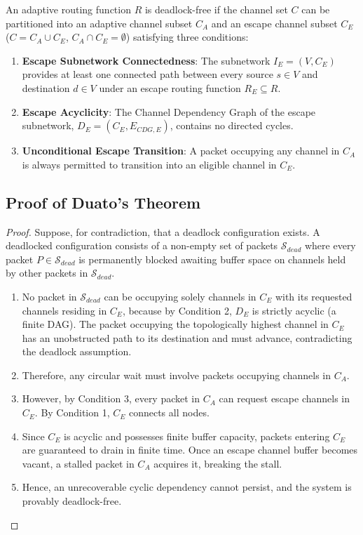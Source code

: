 \begin{theorem}[Duato, 1993]
An adaptive routing function $R$ is deadlock-free if the channel set $C$ can be partitioned into an adaptive channel subset $C_A$ and an escape channel subset $C_E$ ($C = C_A \cup C_E$, $C_A \cap C_E = \emptyset$) satisfying three conditions:
\begin{enumerate}
    \item \textbf{Escape Subnetwork Connectedness}: The subnetwork $I_E = (V, C_E)$ provides at least one connected path between every source $s \in V$ and destination $d \in V$ under an escape routing function $R_E \subseteq R$.
    \item \textbf{Escape Acyclicity}: The Channel Dependency Graph of the escape subnetwork, $D_E = (C_E, E_{CDG, E})$, contains no directed cycles.
    \item \textbf{Unconditional Escape Transition}: A packet occupying any channel in $C_A$ is always permitted to transition into an eligible channel in $C_E$.
\end{enumerate}
\end{theorem}

\subsection{Proof of Duato's Theorem}
\begin{proof}
Suppose, for contradiction, that a deadlock configuration exists. A deadlocked configuration consists of a non-empty set of packets $\mathcal{S}_{dead}$ where every packet $P \in \mathcal{S}_{dead}$ is permanently blocked awaiting buffer space on channels held by other packets in $\mathcal{S}_{dead}$.

\begin{enumerate}
    \item No packet in $\mathcal{S}_{dead}$ can be occupying solely channels in $C_E$ with its requested channels residing in $C_E$, because by Condition 2, $D_E$ is strictly acyclic (a finite DAG). The packet occupying the topologically highest channel in $C_E$ has an unobstructed path to its destination and must advance, contradicting the deadlock assumption.
    \item Therefore, any circular wait must involve packets occupying channels in $C_A$.
    \item However, by Condition 3, every packet in $C_A$ can request escape channels in $C_E$. By Condition 1, $C_E$ connects all nodes.
    \item Since $C_E$ is acyclic and possesses finite buffer capacity, packets entering $C_E$ are guaranteed to drain in finite time. Once an escape channel buffer becomes vacant, a stalled packet in $C_A$ acquires it, breaking the stall.
    \item Hence, an unrecoverable cyclic dependency cannot persist, and the system is provably deadlock-free.
\end{enumerate}
\end{proof}

